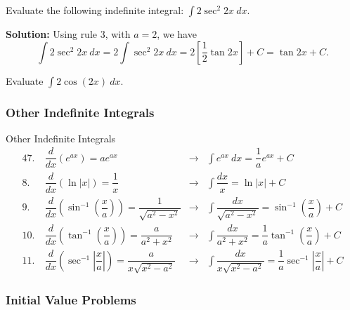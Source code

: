 \documentclass[cal1spr16Lectures.tex]{subfiles}
\begin{document}
\begin{frame}\footnotesize
\begin{ex} 
Evaluate the following indefinite integral: $\int 2 \sec^2 2x\ dx$. 
\end{ex}

\vspace{1pc}
{\bf Solution:}  Using rule 3, with $a=2$, we have
\[\int 2 \sec^2 2x\ dx = 2 \int \sec^2 2x\ dx = 2 \left[ \dfrac{1}{2} \tan 2x \right] + C = \tan 2x + C.\]

\vspace{1pc}
\begin{exe} 
Evaluate $\int 2 \cos(2x)\ dx$. 
\end{exe}
\end{frame}

\subsubsection{Other Indefinite Integrals}

\begin{frame}{\small Other Indefinite Integrals}\footnotesize
\begin{alignat*}{4}
7.\ &\dfrac{d}{dx} (e^{ax}) = a e^{ax} &\longrightarrow &\int e^{ax}\ dx = \dfrac{1}{a} e^{ax} + C \\
8.\ &\dfrac{d}{dx} (\ln |x|) = \dfrac{1}{x} &\longrightarrow &\int \dfrac{dx}{x} = \ln |x| + C \\
9.\ &\dfrac{d}{dx} \left( \sin^{-1} \left( \dfrac{x}{a} \right) \right) = \dfrac{1}{\sqrt{a^2-x^2}} &\longrightarrow 
&\int \dfrac{dx}{\sqrt{a^2-x^2}} = \sin^{-1} \left( \dfrac{x}{a} \right) + C \\
10.\ &\dfrac{d}{dx} \left( \tan^{-1} \left( \dfrac{x}{a} \right) \right) = \dfrac{a}{a^2+x^2} &\longrightarrow 
&\int \dfrac{dx}{a^2+x^2} = \dfrac{1}{a} \tan^{-1} \left( \dfrac{x}{a} \right) + C \\
11.\ &\dfrac{d}{dx} \left( \sec^{-1} \left| \dfrac{x}{a} \right| \right) = \dfrac{a}{x \sqrt{x^2-a^2}} &\longrightarrow 
&\int \dfrac{dx}{x \sqrt{x^2-a^2}} = \dfrac{1}{a} \sec^{-1} \left| \dfrac{x}{a} \right| + C
\end{alignat*}
\end{frame}

\subsubsection{Initial Value Problems}
\end{document}
